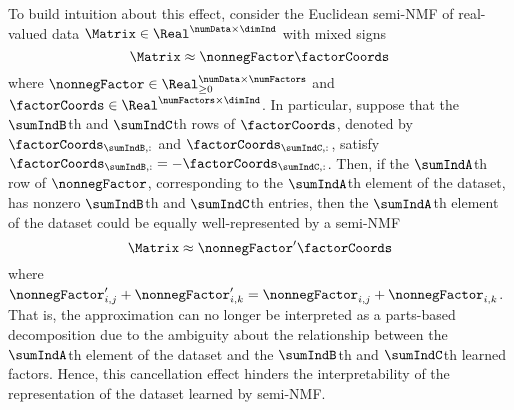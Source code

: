 To build intuition about this effect, consider the Euclidean semi-NMF of real-valued data $\Matrix \in \Real^{\numData \times \dimInd}$ with mixed signs 
\begin{equation}
    \label{eq:eucl snmf}
    \Matrix \approx \nonnegFactor \factorCoords
\end{equation}
where $\nonnegFactor \in \Real_{\geq 0}^{\numData \times \numFactors}$ and $\factorCoords \in \Real^{\numFactors \times \dimInd}$. In particular, suppose that the $\sumIndB$th and $\sumIndC$th rows of $\factorCoords$, denoted by $\factorCoords_{\sumIndB,:}$ and $\factorCoords_{\sumIndC,:}$, satisfy $\factorCoords_{\sumIndB,:} = - \factorCoords_{\sumIndC, :}$. Then, if the $\sumIndA$th row of $\nonnegFactor$, corresponding to the $\sumIndA$th element of the dataset, has nonzero $\sumIndB$th and $\sumIndC$th entries, then the $\sumIndA$th element of the dataset could be equally well-represented by a semi-NMF
\begin{equation}
    \Matrix \approx \nonnegFactor' \factorCoords
\end{equation}
where $\nonnegFactor'_{i,j} + \nonnegFactor'_{i,k} = \nonnegFactor_{i,j} + \nonnegFactor_{i,k}$. That is, the approximation can no longer be interpreted as a parts-based decomposition due to the ambiguity about the relationship between the $\sumIndA$th element of the dataset and the $\sumIndB$th and $\sumIndC$th learned factors. Hence, this cancellation effect hinders the interpretability of the representation of the dataset learned by semi-NMF. 

